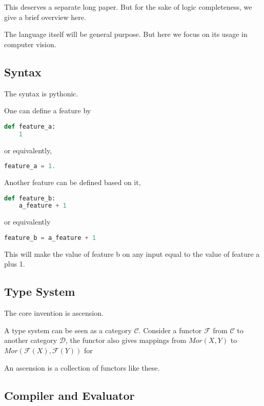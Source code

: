 \documentclass[11pt]{article} 	%
\theoremstyle{definition}
\begin{document}
This deserves a separate long paper. But for the sake of logic completeness, we give a brief overview here.

The language itself will be general purpose. But here we focus on its usage in computer vision.

\subsection{Syntax}

The syntax is pythonic.

One can define a feature by
\begin{lstlisting}[language=Python]
def feature_a:
    1
\end{lstlisting}

or equivalently,

\begin{lstlisting}[language=Python]
feature_a = 1.
\end{lstlisting}

Another feature can be defined based on it,

\begin{lstlisting}[language=Python]
def feature_b:
    a_feature + 1
\end{lstlisting}

or equivalently

\begin{lstlisting}[language=Python]
feature_b = a_feature + 1
\end{lstlisting}

This will make the value of feature b on any input equal to the value of feature a plus 1.

\subsection{Type System}

The core invention is ascension.

A type system can be seen as a category $\mathcal{C}$. Consider a functor $\mathcal{F}$ from $\mathcal{C}$ to another category $\mathcal{D}$,
the functor also gives mappings from $Mor(X,Y)$ to $Mor(\mathcal{F}(X), \mathcal{F}(Y))$ for 

An ascension is a collection of functors like these.

\subsection{Compiler and Evaluator}
\end{document}
